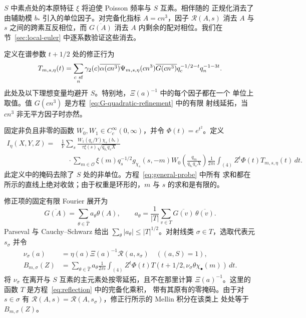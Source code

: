 \documentclass[11pt,a4paper]{article}
\numberwithin{equation}{section}
\numberwithin{figure}{section}
\theoremstyle{definition}
\theoremstyle{remark}
\begin{document}
$S$ 中素点处的本原特征 $\xi$ 将迫使 Poisson 频率与 $S$ 互素。相伴随的
正规化消去了由辅助模 $b_*$ 引入的单位因子。对完备化指标 $A=cn^3$，因子
$\mathcal R(A,s)$ 消去 $A$ 与 $s$ 之间的跨素互反相位，而
$\overline{G(A)}$ 消去 $A$ 内剩余的配对相位。我们在
节~\ref{sec:local-euler} 中逐系数验证这些消去。

定义在谱参数 $t+1/2$ 处的修正行为
\[
 T_{m,s,\eta}(t)=
 \sum_{\substack{c\ {\rm sf}\\n}}
 \gamma_2(c)\overline{\alpha(cn^3)}\Psi_{m,s,\eta}(cn^3)
 \overline{G(cn^3)}q_c^{-1/2-t}q_n^{-1-3t}.
\]
此处及以下理想变量均避开 $S$。特别地，$\Xi(a)^{-1}$ 中的每个因子都在一个
单位上取值。值 $G(cn^3)$ 是方程~\eqref{eq:G-quadratic-refinement} 中的有限
射线延拓，当 $cn^3$ 非无平方因子时亦然。

固定非负且非零的函数 $W_0,W_1\in C_c^\infty(0,\infty)$，并令
$\Phi(t)=e^{t^2}$。定义
\begin{equation}\label{eq:general-probe}
\begin{aligned}
 I_\eta(X,Y,Z)={}&\frac1Y\sum_s
 \frac{W_1(q_s/Y)\chi_s(b_*)}
      {\tau\xi(s)\sqrt{q_{b_*}q_sX}}\\
 &\quad\cdot\sum_{m\in\mathcal O}
       \xi(m)q_s^{-1/2}g_{\chi_s}(s,-m)
       W_0\!\left(\frac{q_m}{q_{b_*}q_sX}\right)
       \frac1{2\pi i}\int_{(4)}
             Z^t\Phi(t)T_{m,s,\eta}(t)\,dt.
\end{aligned}
\end{equation}
此定义中的掩码去除了 $S$ 处的非单位。方程~\eqref{eq:general-probe} 中所有
求和都在所示的直线上绝对收敛；由于权重是环形的，$m$ 与 $s$ 的求和是有限的。

修正项的固定有限 Fourier 展开为
\[
 \overline{G(A)}=\sum_{\theta\in\widehat T}a_\theta\theta(A),
 \qquad
 a_\theta=\frac1{|T|}\sum_{v\in T}
                 \overline{G(v)}\,\overline{\theta(v)}.
\]
Parseval 与 Cauchy--Schwarz 给出
$\sum_\theta|a_\theta|\le |T|^{1/2}$。对射线类
$\sigma\in T$，选取代表元 $s_\sigma$ 并令
\[
 \begin{aligned}
 \nu_\sigma(a)&=\eta(a)\Xi(a)^{-1}\mathcal R(a,s_\sigma)
       \quad ((a,S)=1),\\
 B_{m,\sigma}(Z)&=\sum_{\theta\in\widehat T}a_\theta
 \frac1{2\pi i}\int_{(4)}Z^t\Phi(t)
       T(t+1/2,\nu_\sigma\theta\chi_\bullet(m))\,dt.
 \end{aligned}
\]
将 $\nu_\sigma$ 在离开与 $S$ 互素的主元素处按零延拓，且不在那里计算
$\Xi(a)^{-1}$。这里的函数 $T$ 是方程~\eqref{eq:reflection} 中的完备化乘积，
带有其原有的零掩码。由于对 $s\in\sigma$ 有
$\mathcal R(A,s)=\mathcal R(A,s_\sigma)$，修正行所示的 Mellin 积分在该类上
处处等于 $B_{m,\sigma}(Z)$。
\end{document}
